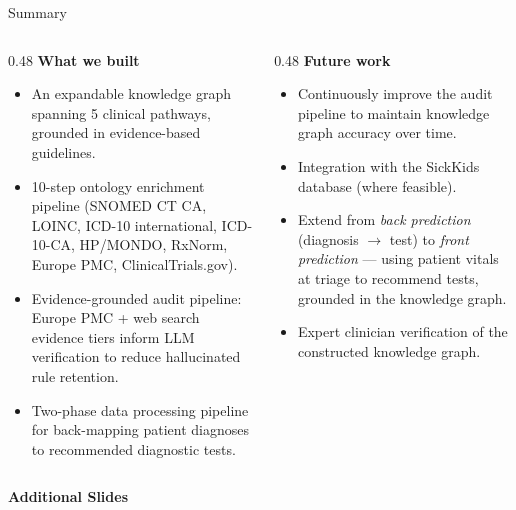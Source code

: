 \documentclass[aspectratio=169]{beamer}
\begin{document}
\begin{frame}{Summary}
  \small
  \begin{columns}[T]
    \begin{column}{0.48\textwidth}
      \textbf{What we built}
      \begin{itemize}
        \item An expandable knowledge graph spanning 5 clinical
              pathways, grounded in evidence-based guidelines.
        \item 10-step ontology enrichment pipeline (SNOMED CT CA,
              LOINC, ICD-10 international, ICD-10-CA, HP/MONDO,
              RxNorm, Europe PMC, ClinicalTrials.gov).
        \item Evidence-grounded audit pipeline: Europe PMC +
              web search evidence tiers inform LLM verification
              to reduce hallucinated rule retention.
        \item Two-phase data processing pipeline for back-mapping
              patient diagnoses to recommended diagnostic tests.
      \end{itemize}
    \end{column}
    \begin{column}{0.48\textwidth}
      \textbf{Future work}
      \begin{itemize}
        \item Continuously improve the audit pipeline to maintain
              knowledge graph accuracy over time.
        \item Integration with the SickKids database
              (where feasible).
        \item Extend from \emph{back prediction} (diagnosis
              $\to$ test) to \emph{front prediction} --- using
              patient vitals at triage to recommend tests,
              grounded in the knowledge graph.
        \item Expert clinician verification of the constructed
              knowledge graph.
      \end{itemize}
    \end{column}
  \end{columns}
\end{frame}

\appendix

\begin{frame}
  \centering
  \vspace{2em}
  {\Large\textbf{Additional Slides}}
\end{frame}
\end{document}
